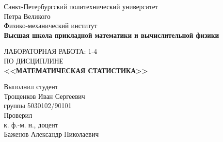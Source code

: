 \documentclass[main.tex]{subfiles}
\begin{document}
\begin{titlepage}
\begin{center}
	\begin{large}
		Санкт-Петербургский политехнический университет\\ Петра Великого\\		
		\vspace{\baselineskip}
		Физико-механический институт\\
		\textbf{Высшая школа прикладной математики и вычислительной физики}\\
	\end{large}
	\vfill
	\Large{{ЛАБОРАТОРНАЯ РАБОТА: 1-4
	\\ {ПО ДИСЦИПЛИНЕ} \\\textbf{<<МАТЕМАТИЧЕСКАЯ СТАТИСТИКА>>}}}
\end{center}
\vfill
\begin{flushright}	
	Выполнил студент\\
	Трощенков Иван Сергеевич\\
	группы 5030102/90101\\
	\vspace{\baselineskip}	
	Проверил\\
	к. ф.-м. н., доцент\\
	Баженов Александр Николаевич
\end{flushright}
\vfill
{}
\end{titlepage}
\end{document}
